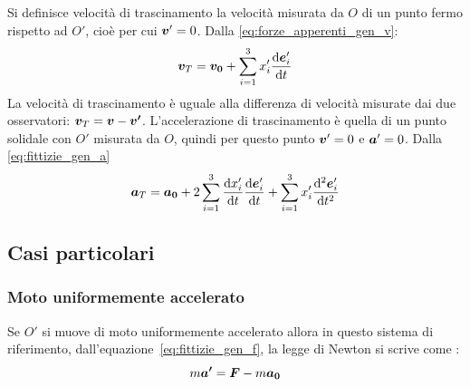 Si definisce velocità di trascinamento la velocità misurata da $O$ di un punto fermo rispetto ad $O'$, cioè per cui $\boldsymbol{v}'=0$. Dalla \eqref{eq:forze_apperenti_gen_v}:
\begin{equation}
  \boldsymbol{v}_T = \boldsymbol{v_0}+\sum_{i=1}^3 x'_i\frac{\mathrm{d} \boldsymbol{e}'_i}{\mathrm{d} t}
  \label{eq:fittizie_gen_vt}
\end{equation}
La velocità di trascinamento è uguale alla differenza di velocità misurate dai due osservatori: $\boldsymbol{v}_T = \boldsymbol{v} - \boldsymbol{v'}$.
L'accelerazione di trascinamento è quella di un punto solidale con $O'$ misurata da $O$, quindi per questo punto $\boldsymbol{v}'=0$ e $\boldsymbol{a}'=0$. Dalla \eqref{eq:fittizie_gen_a}
\begin{equation}
  \boldsymbol{a}_T = \boldsymbol{a_0}
  +2\sum_{i=1}^3 \frac{\mathrm{d} x'_i}{\mathrm{d} t}\frac{\mathrm{d} \boldsymbol{e}'_i}{\mathrm{d} t} + \sum_{i=1}^3 x'_i\frac{\mathrm{d}^2 \boldsymbol{e}'_i}{\mathrm{d} t^2}
\end{equation}




\subsection{Casi particolari}
\subsubsection{Moto uniformemente accelerato}
Se $O'$ si muove di moto uniformemente accelerato allora in questo sistema di riferimento, dall'equazione~\eqref{eq:fittizie_gen_f}, la legge di Newton si scrive come :
\begin{equation}
  m\boldsymbol{a'} = \boldsymbol{F} - m\boldsymbol{a_0}
\end{equation}

